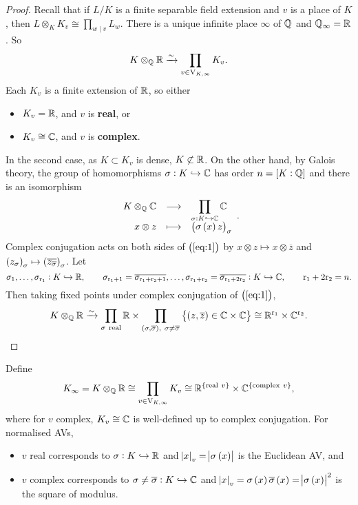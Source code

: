 \begin{proof}
Recall that if $ L / K $ is a finite separable field extension and $ v $ is a place of $ K $, then $ L \otimes_K K_v \cong \prod_{w \mid v} L_w $. There is a unique infinite place $ \infty $ of $ \mathbb{Q} $ and $ \mathbb{Q}_\infty = \mathbb{R} $. So
$$ K \otimes_{\mathbb{Q}} \mathbb{R} \xrightarrow{\sim} \prod_{v \in \mathrm{V}_{K, \infty}} K_v. $$
Each $ K_v $ is a finite extension of $ \mathbb{R} $, so either
\begin{itemize}
\item $ K_v = \mathbb{R} $, and $ v $ is \textbf{real}, or
\item $ K_v \cong \mathbb{C} $, and $ v $ is \textbf{complex}.
\end{itemize}
In the second case, as $ K \subset K_v $ is dense, $ K \not\subset \mathbb{R} $. On the other hand, by Galois theory, the group of homomorphisms $ \sigma : K \hookrightarrow \mathbb{C} $ has order $ n = \sbr{K : \QQ} $ and there is an isomorphism
\begin{equation}
\label{eq:1}
\function{K \otimes_\QQ \CC}{\prod_{\sigma : K \hookrightarrow \CC} \CC}{x \otimes z}{\br{\sigma\br{x}z}_\sigma}.
\end{equation}
Complex conjugation acts on both sides of $ \br{\ref{eq:1}} $ by $ x \otimes z \mapsto x \otimes \overline{z} $ and $ \br{z_\sigma}_\sigma \mapsto \br{\overline{z_{\overline{\sigma}}}}_\sigma $. Let
$$ \sigma_1, \dots, \sigma_{\mathrm{r}_1} : K \hookrightarrow \mathbb{R}, \qquad \sigma_{\mathrm{r}_1 + 1} = \overline{\sigma_{\mathrm{r}_1 + \mathrm{r}_2 + 1}}, \dots, \sigma_{\mathrm{r}_1 + \mathrm{r}_2} = \overline{\sigma_{\mathrm{r}_1 + 2\mathrm{r}_2}} : K \hookrightarrow \mathbb{C}, \qquad \mathrm{r}_1 + 2\mathrm{r}_2 = n. $$
Then taking fixed points under complex conjugation of $ \br{\ref{eq:1}} $,
$$ K \otimes_\QQ \RR \xrightarrow{\sim} \prod_{\sigma \ \text{real}} \RR \times \prod_{\br{\sigma, \overline{\sigma}}, \ \sigma \ne \overline{\sigma}} \cbr{\br{z, \overline{z}} \in \CC \times \CC} \cong \RR^{\r_1} \times \CC^{\r_2}. $$
\end{proof}

\pagebreak

\begin{notation*}
Define
$$ K_\infty = K \otimes_\QQ \RR \cong \prod_{v \in \V_{K, \infty}} K_v \cong \RR^{\cbr{\text{real} \ v}} \times \CC^{\cbr{\text{complex} \ v}}, $$
where for $ v $ complex, $ K_v \cong \mathbb{C} $ is well-defined up to complex conjugation. For normalised AVs,
\begin{itemize}
\item $ v $ real corresponds to $ \sigma : K \hookrightarrow \mathbb{R} $ and $ \abs{x}_v = \abs{\sigma\br{x}} $ is the Euclidean AV, and
\item $ v $ complex corresponds to $ \sigma \ne \overline{\sigma} : K \hookrightarrow \mathbb{C} $ and $ \abs{x}_v = \sigma\br{x}\overline{\sigma}\br{x} = \abs{\sigma\br{x}}^2 $ is the square of modulus.
\end{itemize}
\end{notation*}


